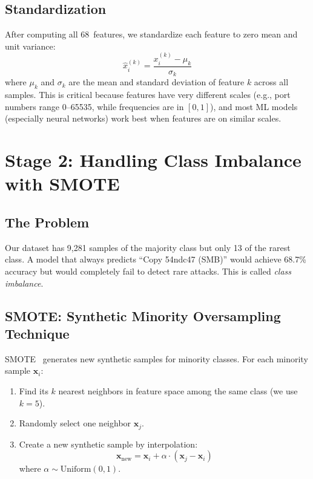 \documentclass[conference]{IEEEtran}
\newcommand{\vect}[1]{\bm{#1}}
\begin{document}
\subsection{Standardization}

After computing all 68~features, we standardize each feature to zero mean and unit variance:
\begin{equation}
    \hat{x}^{(k)}_i = \frac{x^{(k)}_i - \mu_k}{\sigma_k}
\end{equation}
where $\mu_k$ and $\sigma_k$ are the mean and standard deviation of feature $k$ across all samples. This is critical because features have very different scales (e.g., port numbers range 0--65535, while frequencies are in $[0,1]$), and most ML models (especially neural networks) work best when features are on similar scales.

\section{Stage 2: Handling Class Imbalance with SMOTE}
\label{sec:smote}

\subsection{The Problem}

Our dataset has 9{,}281 samples of the majority class but only 13 of the rarest class. A model that always predicts ``Copy 54ndc47 (SMB)'' would achieve 68.7\% accuracy but would completely fail to detect rare attacks. This is called \emph{class imbalance}.

\subsection{SMOTE: Synthetic Minority Oversampling Technique}

SMOTE~\cite{chawla2002smote} generates new synthetic samples for minority classes. For each minority sample $\vect{x}_i$:

\begin{enumerate}
    \item Find its $k$ nearest neighbors in feature space among the same class (we use $k=5$).
    \item Randomly select one neighbor $\vect{x}_j$.
    \item Create a new synthetic sample by interpolation:
    \begin{equation}
        \vect{x}_{\text{new}} = \vect{x}_i + \alpha \cdot (\vect{x}_j - \vect{x}_i)
    \end{equation}
    where $\alpha \sim \text{Uniform}(0, 1)$.
\end{enumerate}
\end{document}
